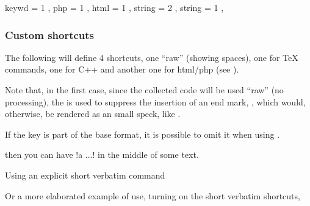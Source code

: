 \begin{codestore}[demoHL]
  {
   keywd  = {1}{\bfseries\color{blue}} ,
   php    = {1}{\bfseries\color{red}}  ,
   html   = {1}{\bfseries\color{green}}  ,
   string = {2}{\slshape\color{white!50!red}}  ,
   string = {1}{\slshape\color{white!50!black}}  ,
  }
\end{codestore}




\subsubsection{Custom shortcuts}

The following will define 4 shortcuts, one ``raw'' (showing spaces), one for \TeX{} commands, one for C++ and another one for html/php (see ). 


Note that, in the first case, since the collected code will be used ``raw'' (no processing), the  is used to suppress the insertion of an end mark, , which would, otherwise, be rendered as an small speck, like .

\begin{tsremark}
  If the key  is part of the base format, it is possible to omit it when using \tsobj{\hlDisplay}.
\end{tsremark}

\begin{codestore}[demoverb]

then you can have \cvSVerb!a \short \one ...! in the middle of some text.
\end{codestore}

Using an explicit short verbatim command

Or a more elaborated example of use, turning on the short verbatim shortcuts, \tsobj{\cvSVerbOn}

